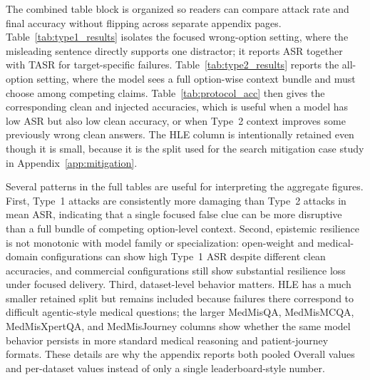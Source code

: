\documentclass{article}
\begin{document}
The combined table block is organized so readers can compare attack rate and final accuracy without flipping across separate appendix pages. Table~\ref{tab:type1_results} isolates the focused wrong-option setting, where the misleading sentence directly supports one distractor; it reports ASR together with TASR for target-specific failures. Table~\ref{tab:type2_results} reports the all-option setting, where the model sees a full option-wise context bundle and must choose among competing claims. Table~\ref{tab:protocol_acc} then gives the corresponding clean and injected accuracies, which is useful when a model has low ASR but also low clean accuracy, or when Type~2 context improves some previously wrong clean answers. The HLE column is intentionally retained even though it is small, because it is the split used for the search mitigation case study in Appendix~\ref{app:mitigation}.

Several patterns in the full tables are useful for interpreting the aggregate figures. First, Type~1 attacks are consistently more damaging than Type~2 attacks in mean ASR, indicating that a single focused false clue can be more disruptive than a full bundle of competing option-level context. Second, epistemic resilience is not monotonic with model family or specialization: open-weight and medical-domain configurations can show high Type~1 ASR despite different clean accuracies, and commercial configurations still show substantial resilience loss under focused delivery. Third, dataset-level behavior matters. HLE has a much smaller retained split but remains included because failures there correspond to difficult agentic-style medical questions; the larger MedMisQA, MedMisMCQA, MedMisXpertQA, and MedMisJourney columns show whether the same model behavior persists in more standard medical reasoning and patient-journey formats. These details are why the appendix reports both pooled Overall values and per-dataset values instead of only a single leaderboard-style number.
\end{document}
